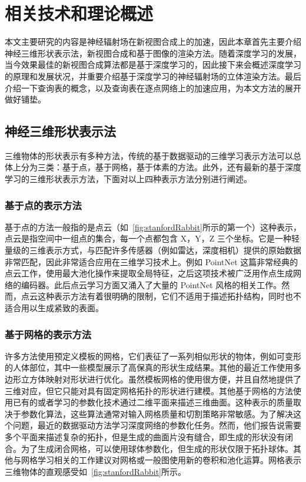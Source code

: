 
\chapter{相关技术和理论概述}\label{equations}
本文主要研究的内容是神经辐射场在新视图合成上的加速，因此本章首先主要介绍神经三维形状表示法，新视图合成和基于图像的渲染方法。随着深度学习的发展，当今效果最佳的新视图合成算法都是基于深度学习的，因此接下来会概述深度学习的原理和发展状况，并重要介绍基于深度学习的神经辐射场的立体渲染方法。最后介绍一下查询表的概念，以及查询表在逐点网络上的加速应用，为本文方法的展开做好铺垫。

\section{神经三维形状表示法}
三维物体的形状表示有多种方法，传统的基于数据驱动的三维学习表示方法可以总体上分为三类：基于点，基于网格，基于体素的方法。此外，还有最新的基于深度学习的三维形状表示方法，下面对以上四种表示方法分别进行阐述。

\subsection{基于点的表示方法} 
基于点的方法一般指的是点云（如~\ref{fig:stanfordRabbit}所示的第一个）这种表示，点云是指空间中一组点的集合，每一个点都包含 X，Y，Z 三个坐标。它是一种轻量级的三维表示方式，与匹配许多传感器（例如雷达，深度相机）提供的原始数据非常匹配，因此非常适合应用在三维学习技术上。例如 PointNet\cite{qi2017pointnet,qi2017pointnet++} 这篇非常经典的点云工作，使用最大池化操作来提取全局特征，之后这项技术被广泛用作点生成网络\cite{yang2017foldingnet,achlioptas2018learning}的编码器。此后点云学习方面又涌入了大量的 PointNet 风格的相关工作。然而，点云这种表示方法有着很明确的限制，它们不适用于描述拓扑结构，同时也不适合用以生成紧致的表面。

\subsection{基于网格的表示方法}
许多方法使用预定义模板的网格，它们表征了一系列相似形状的物体，例如可变形的人体部位，其中一些模型\cite{2017Deformable}展示了高保真的形状生成结果。其他的最近工作\cite{baque2018geodesic}使用多边形立方体映射\cite{tarini2004polycube}对形状进行优化。虽然模板网格的使用很方便，并且自然地提供了三维对应，但它只能对具有固定网格拓扑的形状进行建模。其他基于网格的方法使用已有的\cite{sinha2016deep,maron2017convolutional}或者学习的\cite{groueix2018papier,ben2018multi}参数化技术通过二维平面来描述三维曲面。这种表示的质量取决于参数化算法，这些算法通常对输入网格质量和切割策略非常敏感。为了解决这个问题，最近的数据驱动方法\cite{yang2017foldingnet}学习深度网络的参数化任务。然而，他们报告说需要多个平面来描述复杂的拓扑，但是生成的曲面片没有缝合，即生成的形状没有闭合。为了生成闭合网格，可以使用球体参数化\cite{groueix2018papier,ben2018multi}，但生成的形状仅限于拓扑球体。其他与网格学习相关的工作建议对网格\cite{defferrard2016convolutional,verma2018feastnet}或一般图\cite{bruna2013spectral}使用新的卷积和池化运算。网格表示三维物体的直观感受如~\ref{fig:stanfordRabbit}所示。

